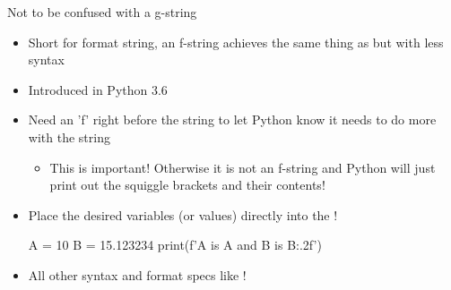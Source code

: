 \documentclass[pdf, aspectratio=169, 12pt]{beamer}
\begin{document}
\begin{frame}[fragile]{Not to be confused with a g-string}
	\medskip
	\begin{itemize}
		\item Short for format string, an f-string achieves the same thing as  but with less syntax
		\item Introduced in Python 3.6
		\item Need an 'f' right before the string to let Python know it needs to do more with the string
			\begin{itemize}
				\item This is important! Otherwise it is not an f-string and Python will just print out the squiggle brackets and their contents!
			\end{itemize}
		\item Place the desired variables (or values) directly into the \pyi{\{ \}}!
			\begin{pythoncode}
				A = 10
				B = 15.123234
				print(f'A is {A} and B is {B:.2f}')
			\end{pythoncode}
		\item All other syntax and format specs like !
	\end{itemize}
	
\end{frame}
\end{document}
